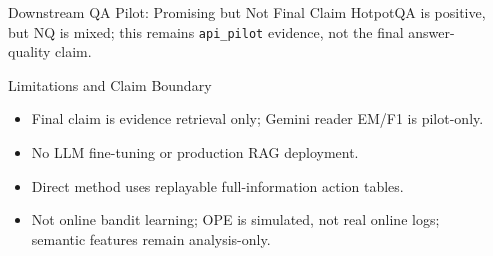 \documentclass[final,20pt]{beamer}
\newlength{\sepwidth}
\newlength{\colwidth}
\newcommand{\separatorcolumn}{\begin{column}{\sepwidth}\end{column}}
\begin{document}
\begin{frame}[t]
\begin{columns}[t]
\begin{column}{\colwidth}
\begin{exampleblock}{Downstream QA Pilot: Promising but Not Final Claim}
    \vspace{-0.5em}
    \small HotpotQA is positive, but NQ is mixed; this remains \texttt{api\_pilot} evidence, not the final answer-quality claim.
  \end{exampleblock}

  \begin{block}{Limitations and Claim Boundary}
    \begin{itemize}
      \item Final claim is evidence retrieval only; Gemini reader EM/F1 is pilot-only.
      \item No LLM fine-tuning or production RAG deployment.
      \item Direct method uses replayable full-information action tables.
      \item Not online bandit learning; OPE is simulated, not real online logs; semantic features remain analysis-only.
    \end{itemize}
  \end{block}

\end{column}
\separatorcolumn

\end{columns}
\end{frame}
\end{document}
